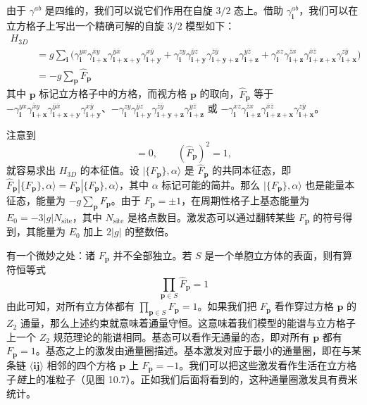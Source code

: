 由于 $\gamma^{ab}$ 是四维的，我们可以说它们作用在自旋 $3/2$ 态上。借助 $\gamma_{\pmb{i}}^{ab}$，我们可以在立方格子上写出一个精确可解的自旋 $3/2$ 模型如下：
\begin{align*}
H_{3D}&\\
&=g\sum_{\pmb{i}}\Big(\gamma_{\pmb{i}}^{yx}\gamma_{\pmb{i}+\pmb{x}}^{\bar{x}y}\gamma_{\pmb{i}+\pmb{x}+\pmb{y}}^{\bar{y}\bar{x}}\gamma_{\pmb{i}+\pmb{y}}^{x\bar{y}}+\gamma_{\pmb{i}}^{zy}\gamma_{\pmb{i}+\pmb{y}}^{\bar{y}z}\gamma_{\pmb{i}+\pmb{y}+\pmb{z}}^{\bar{z}\bar{y}}\gamma_{\pmb{i}+\pmb{z}}^{y\bar{z}}+\gamma_{\pmb{i}}^{xz}\gamma_{\pmb{i}+\pmb{z}}^{\bar{z}x}\gamma_{\pmb{i}+\pmb{z}+\pmb{x}}^{\bar{x}\bar{z}}\gamma_{\pmb{i}+\pmb{x}}^{z\bar{y}}\Big)\\
&=-g\sum_{\pmb{p}}\hat F_{\pmb{p}} \tag{10.5.4}
\end{align*}
其中 $\pmb{p}$ 标记立方格子中的方格，而视方格 $\pmb{p}$ 的取向，$\hat F_{\pmb{p}}$ 等于 $-\gamma_{\pmb{i}}^{yx}\allowbreak\gamma_{\pmb{i}+\pmb{x}}^{\bar{x}y}\allowbreak\gamma_{\pmb{i}+\pmb{x}+\pmb{y}}^{\bar{y}\bar{x}}\allowbreak\gamma_{\pmb{i}+\pmb{y}}^{x\bar{y}}$、$-\gamma_{\pmb{i}}^{zy}\allowbreak\gamma_{\pmb{i}+\pmb{y}}^{\bar{y}z}\allowbreak\gamma_{\pmb{i}+\pmb{y}+\pmb{z}}^{\bar{z}\bar{y}}\allowbreak\gamma_{\pmb{i}+\pmb{z}}^{y\bar{z}}$ 或 $-\gamma_{\pmb{i}}^{xz}\allowbreak\gamma_{\pmb{i}+\pmb{z}}^{\bar{z}x}\allowbreak\gamma_{\pmb{i}+\pmb{z}+\pmb{x}}^{\bar{x}\bar{z}}\allowbreak\gamma_{\pmb{i}+\pmb{x}}^{z\bar{y}}$。

注意到
\begin{equation*}
[\hat F_{\pmb{p}},\hat F_{\pmb{p}}']=0, \qquad (\hat F_{\pmb{p}})^{2}=1,
\end{equation*}
就容易求出 $H_{3D}$ 的本征值。设 $|\{F_{\pmb{p}}\},\alpha\rangle$ 是 $\hat F_{\pmb{p}}$ 的共同本征态，即 $\hat F_{\pmb{p}}|\{F_{\pmb{p}}\},\alpha\rangle=F_{\pmb{p}}|\{F_{\pmb{p}}\},\alpha\rangle$，其中 $\alpha$ 标记可能的简并。那么 $|\{F_{\pmb{p}}\},\alpha\rangle$ 也是能量本征态，能量为 $-g\sum_{\pmb{p}}F_{\pmb{p}}$。由于 $F_{\pmb{p}}=\pm1$，在周期性格子上基态能量为 $E_0=-3|g|N_{\text{site}}$，其中 $N_{\text{site}}$ 是格点数目。激发态可以通过翻转某些 $F_{\pmb{p}}$ 的符号得到，其能量为 $E_0$ 加上 $2|g|$ 的整数倍。

有一个微妙之处：诸 $F_{\pmb{p}}$ 并不全部独立。若 $S$ 是一个单胞立方体的表面，则有算符恒等式
\begin{equation*}
\prod_{\pmb{p}\in S}\hat F_{\pmb{p}}=1
\end{equation*}
由此可知，对所有立方体都有 $\prod_{\pmb{p}\in S}F_{\pmb{p}}=1$。如果我们把 $F_{\pmb{p}}$ 看作穿过方格 $\pmb{p}$ 的 $Z_2$ 通量，那么上述约束就意味着通量守恒。这意味着我们模型的能谱与立方格子上一个 $Z_2$ 规范理论的能谱相同。基态可以看作无通量的态，即对所有 $\pmb{p}$ 都有 $F_{\pmb{p}}=1$。基态之上的激发由通量圈描述。基本激发对应于最小的通量圈，即在与某条链 $\langle\pmb{i}\pmb{j}\rangle$ 相邻的四个方格 $\pmb{p}$ 上 $F_{\pmb{p}}=-1$。我们可以把这些激发看作生活在立方格子\emph{链}上的准粒子（见图 10.7）。正如我们后面将看到的，这种通量圈激发具有费米统计。

